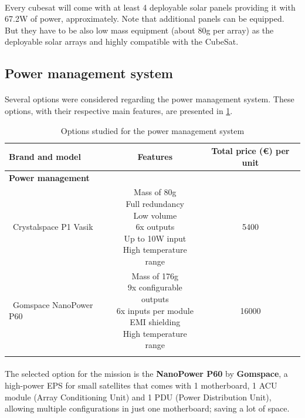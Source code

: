 \paragraph{}Every cubesat will come with at least 4 deployable solar panels providing it with 67.2W of power, approximately. Note that additional panels can be equipped. But they have to be also low mass equipment (about 80g per array) as the deployable solar arrays and highly compatible with the CubeSat.

\subsection{Power management system}

\paragraph{}Several options were considered regarding the power management system. These options, with their respective main features, are presented in \ref{optionspowermanagementsystem}.

\begin{longtable}{| l | c | c | }
\hline
\rowcolor[gray]{0.80}	\textbf{Brand and model} &  \textbf{Features}     & \textbf{Total price (\euro) per unit}   \\
\hline
\endfirsthead
\rowcolor[gray]{0.85} \textbf{Power management} &  &  \\
	   ~Crystalspace P1 Vasik & \makecell{Mass of 80g \\ Full redundancy \\ Low volume \\ 6x outputs \\ Up to 10W input \\ High temperature range} & 5400 \\
	\hline
	   ~Gomspace NanoPower P60 & \makecell{Mass of 176g \\ 9x configurable outputs \\ 6x inputs per module \\ EMI shielding \\ High temperature range} & 16000 \\
	\hline
\caption{Options studied for the power management system}
\label{optionspowermanagementsystem}
\end{longtable}

\paragraph{}The selected option for the mission is the \textbf{NanoPower P60} by \textbf{Gomspace}, a high-power EPS for small satellites that comes with 1 motherboard, 1 ACU module (Array Conditioning Unit) and 1 PDU (Power Distribution Unit), allowing multiple configurations in just one motherboard; saving a lot of space.

